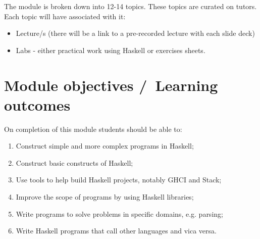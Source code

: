 \documentclass{article}
\begin{document}
The module is broken down into 12-14 topics. These topics are curated on tutors. 
Each topic will have associated with it: 
\begin{itemize}
    \item Lecture/s (there will be a link to a pre-recorded lecture with each slide deck)
    \item Labs - either practical work using Haskell or exercises sheets. 
\end{itemize}
  



\pagebreak
\section{Module objectives /\ Learning outcomes}
On completion of this module students should be able to: 
\begin{enumerate}
    \item  Construct simple and more complex programs in Haskell;
    \item  Construct basic constructs of Haskell;
    \item  Use tools to help build Haskell projects, notably GHCI and Stack;
    \item  Improve the scope of programs by using Haskell libraries;
    \item  Write programs to solve problems in specific domains, e.g. parsing;
    \item  Write Haskell programs that call other languages and vica versa.
\end{enumerate}
\pagebreak
\end{document}
